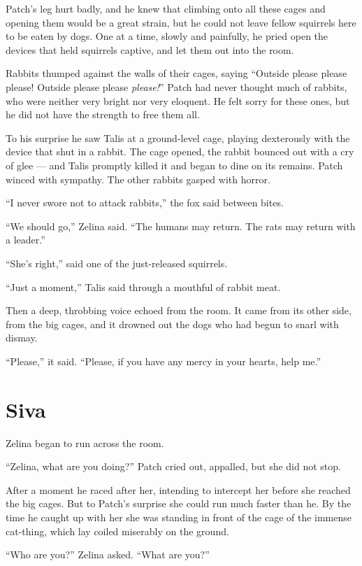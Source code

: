 \documentclass[ebook,oneside,openany,12pt]{memoir}
\begin{document}
Patch’s leg hurt badly, and he knew that climbing onto all these cages
and opening them would be a great strain, but he could not leave
fellow squirrels here to be eaten by dogs. One at a time, slowly and
painfully, he pried open the devices that held squirrels captive, and
let them out into the room.

Rabbits thumped against the walls of their cages, saying “Outside
please please please! Outside please please \emph{please!}” Patch
had never thought much of rabbits, who were neither very bright nor
very eloquent. He felt sorry for these ones, but he did not have the
strength to free them all.

To his surprise he saw Talis at a ground-level cage, playing
dexterously with the device that shut in a rabbit. The cage opened,
the rabbit bounced out with a cry of glee — and Talis promptly killed
it and began to dine on its remains. Patch winced with sympathy. The
other rabbits gasped with horror.

“I never swore not to attack rabbits,” the fox said between bites.

“We should go,” Zelina said. “The humans may return. The rats may
return with a leader.”

“She’s right,” said one of the just-released squirrels.

“Just a moment,” Talis said through a mouthful of rabbit meat.

Then a deep, throbbing voice echoed from the room. It came from its
other side, from the big cages, and it drowned out the dogs who had
begun to snarl with dismay.

“Please,” it said. “Please, if you have any mercy in your hearts, help
me.”


\section{Siva}

Zelina began to run across the room.

“Zelina, what are you doing?” Patch cried out, appalled, but she did
not stop.

After a moment he raced after her, intending to intercept her before
she reached the big cages. But to Patch’s surprise she could run much
faster than he. By the time he caught up with her she was standing in
front of the cage of the immense cat-thing, which lay coiled miserably
on the ground.

“Who are you?” Zelina asked. “What are you?”
\end{document}
